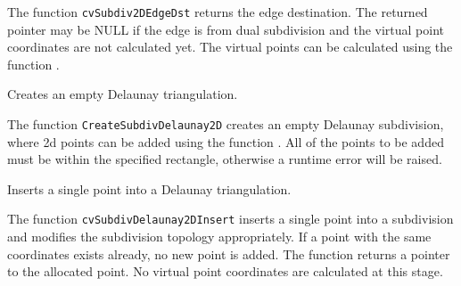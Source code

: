 \begin{description}
\end{description}

The function \texttt{cvSubdiv2DEdgeDst} returns the edge destination. The
returned pointer may be NULL if the edge is from dual subdivision and
the virtual point coordinates are not calculated yet. The virtual points
can be calculated using the function .

\label{CreateSubdivDelaunay2D}

Creates an empty Delaunay triangulation.


\begin{description}
\end{description}

The function \texttt{CreateSubdivDelaunay2D} creates an empty Delaunay
subdivision, where 2d points can be added using the function
. All of the points to be added must be within
the specified rectangle, otherwise a runtime error will be raised.

\label{SubdivDelaunay2DInsert}

Inserts a single point into a Delaunay triangulation.


\begin{description}
\end{description}

The function \texttt{cvSubdivDelaunay2DInsert} inserts a single point into a subdivision and modifies the subdivision topology appropriately. If a point with the same coordinates exists already, no new point is added. The function returns a pointer to the allocated point. No virtual point coordinates are calculated at this stage.


